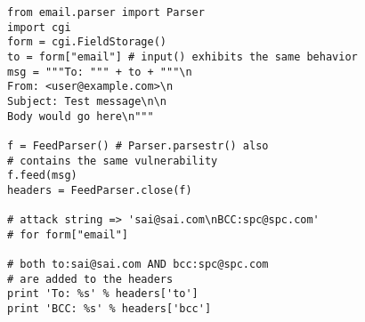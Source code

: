 \begin{lstlisting}
from email.parser import Parser
import cgi
form = cgi.FieldStorage()
to = form["email"] # input() exhibits the same behavior
msg = """To: """ + to + """\n
From: <user@example.com>\n
Subject: Test message\n\n
Body would go here\n"""

f = FeedParser() # Parser.parsestr() also 
# contains the same vulnerability
f.feed(msg)
headers = FeedParser.close(f)

# attack string => 'sai@sai.com\nBCC:spc@spc.com'
# for form["email"]

# both to:sai@sai.com AND bcc:spc@spc.com 
# are added to the headers
print 'To: %s' % headers['to']
print 'BCC: %s' % headers['bcc']
\end{lstlisting}